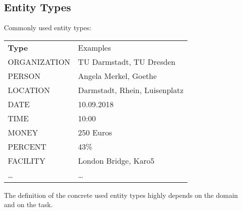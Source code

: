         \subsection{Entity Types} %
            Commonly used entity types:
            \begin{table}[H]
            	\centering
            	\begin{tabular}{l l}
            		\textbf{Type} & Examples                      \\
            		ORGANIZATION  & TU Darmstadt, TU Dresden      \\
            		PERSON        & Angela Merkel, Goethe         \\
            		LOCATION      & Darmstadt, Rhein, Luisenplatz \\
            		DATE          & 10.09.2018                    \\
            		TIME          & 10:00                         \\
            		MONEY         & 250 Euros                     \\
            		PERCENT       & 43\%                          \\
            		FACILITY      & London Bridge, Karo5          \\
            		\dots         & \dots
            	\end{tabular}
            \end{table}
        	The definition of the concrete used entity types highly depends on the domain and on the task.

